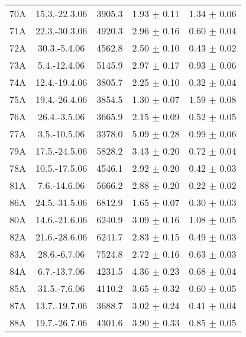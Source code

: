 \documentclass[a4paper,12pt]{article}
\begin{document}
\begin{center}
\begin{longtable}{|c|c|c|c|c|}
    70A &       15.3.-22.3.06   &       3905.3  &       1.93 $\pm$ 0.11 &       1.34 $\pm$ 0.06 \\
    71A &       22.3.-30.3.06   &       4920.3  &       2.96 $\pm$ 0.16 &       0.60 $\pm$ 0.04 \\
    72A &       30.3.-5.4.06    &       4562.8  &       2.50 $\pm$ 0.10 &       0.43 $\pm$ 0.02 \\
    73A &       5.4.-12.4.06    &       5145.9  &       2.97 $\pm$ 0.17 &       0.93 $\pm$ 0.06 \\
    74A &       12.4.-19.4.06   &       3805.7  &       2.25 $\pm$ 0.10 &       0.32 $\pm$ 0.04 \\
    75A &       19.4.-26.4.06   &       3854.5  &       1.30 $\pm$ 0.07 &       1.59 $\pm$ 0.08 \\
    76A &       26.4.-3.5.06    &       3665.9  &       2.15 $\pm$ 0.09 &       0.52 $\pm$ 0.05 \\
    77A &       3.5.-10.5.06    &       3378.0  &       5.09 $\pm$ 0.28 &       0.99 $\pm$ 0.06 \\
    79A &       17.5.-24.5.06   &       5828.2  &       3.43 $\pm$ 0.20 &       0.72 $\pm$ 0.04 \\
    78A &       10.5.-17.5.06   &       4546.1  &       2.92 $\pm$ 0.20 &       0.42 $\pm$ 0.03 \\
    81A &       7.6.-14.6.06    &       5666.2  &       2.88 $\pm$ 0.20 &       0.22 $\pm$ 0.02 \\
    86A &       24.5.-31.5.06   &       6812.9  &       1.65 $\pm$ 0.07 &       0.30 $\pm$ 0.03 \\
    80A &       14.6.-21.6.06   &       6240.9  &       3.09 $\pm$ 0.16 &       1.08 $\pm$ 0.05 \\
    82A &       21.6.-28.6.06   &       6241.7  &       2.83 $\pm$ 0.15 &       0.49 $\pm$ 0.03 \\
    83A &       28.6.-6.7.06    &       7524.8  &       2.72 $\pm$ 0.16 &       0.63 $\pm$ 0.03 \\
    84A &       6.7.-13.7.06    &       4231.5  &       4.36 $\pm$ 0.23 &       0.68 $\pm$ 0.04 \\
    85A &       31.5.-7.6.06    &       4110.2  &       3.65 $\pm$ 0.32 &       0.60 $\pm$ 0.05 \\
    87A &       13.7.-19.7.06   &       3688.7  &       3.02 $\pm$ 0.24 &       0.41 $\pm$ 0.04 \\
    88A &       19.7.-26.7.06   &       4301.6  &       3.90 $\pm$ 0.33 &       0.85 $\pm$ 0.05 \\

\end{longtable}
\end{center}
\end{document}
